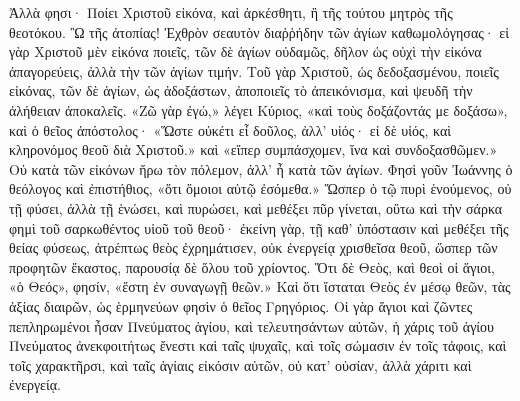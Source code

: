 \documentclass[10pt]{book}
\newcommand{\switchGreek}[1][]{\selectlanguage{polutonikogreek} \switchcolumn*[#1]}
\newcommand{\switchEnglish}{\selectlanguage{english} \switchcolumn}
\begin{document}
\begin{paracol}{2}
\switchGreek

Ἀλλὰ φησι· Ποίει Χριστοῦ εἰκόνα, καὶ ἀρκέσθητι, ἢ τῆς τούτου μητρὸς τῆς θεοτόκου.
Ὢ τῆς ἀτοπίας!
Ἐχθρὸν σεαυτὸν διαῥῥήδην τῶν ἁγίων καθωμολόγησας· εἰ γὰρ Χριστοῦ μὲν εἰκόνα ποιεῖς, τῶν δὲ ἁγίων οὐδαμῶς, δῆλον ὡς οὐχὶ τὴν εἰκόνα ἀπαγορεύεις, ἀλλὰ τὴν τῶν ἁγίων τιμήν.
Τοῦ γὰρ Χριστοῦ, ὡς δεδοξασμένου, ποιεῖς εἰκόνας, τῶν δὲ ἁγίων, ὡς ἀδοξάστων, ἀποποιεῖς τὸ ἀπεικόνισμα, καὶ ψευδῆ τὴν ἀλήθειαν ἀποκαλεῖς.
«Ζῶ γὰρ ἐγώ,» λέγει Κύριος, «καὶ τοὺς δοξάζοντάς με δοξάσω», καὶ ὁ θεῖος ἀπόστολος· «Ὥστε οὐκέτι εἶ δοῦλος, ἀλλ’ υἱός· εἰ δὲ υἱός, καὶ κληρονόμος θεοῦ διὰ Χριστοῦ.» καὶ «εἴπερ συμπάσχομεν, ἵνα καὶ συνδοξασθῶμεν.» Οὐ κατὰ τῶν εἰκόνων ἤρω τὸν πόλεμον, ἀλλ’ ἦ κατὰ τῶν ἁγίων.
Φησὶ γοῦν Ἰωάννης ὁ θεόλογος καὶ ἐπιστήθιος, «ὅτι ὅμοιοι αὐτῷ ἐσόμεθα.» Ὥσπερ ὁ τῷ πυρὶ ἑνούμενος, οὐ τῇ φύσει, ἀλλὰ τῇ ἑνώσει, καὶ πυρώσει, καὶ μεθέξει πῦρ γίνεται, οὕτω καὶ τὴν σάρκα φημὶ τοῦ σαρκωθέντος υἱοῦ τοῦ θεοῦ· ἐκείνη γὰρ, τῇ καθ’ ὑπόστασιν καὶ μεθέξει τῆς θείας φύσεως, ἀτρέπτως θεὸς ἐχρημάτισεν, οὐκ ἐνεργείᾳ χρισθεῖσα θεοῦ, ὥσπερ τῶν προφητῶν ἕκαστος, παρουσίᾳ δὲ ὅλου τοῦ χρίοντος.
Ὅτι δὲ Θεὸς, καὶ θεοὶ οἱ ἅγιοι, «ὁ Θεός», φησίν, «ἔστη ἐν συναγωγῇ θεῶν.»
Καὶ ὅτι ἵσταται Θεὸς ἐν μέσῳ θεῶν, τὰς ἀξίας διαιρῶν, ὡς ἑρμηνεύων φησὶν ὁ θεῖος Γρηγόριος.
Οἱ γὰρ ἅγιοι καὶ ζῶντες πεπληρωμένοι ἦσαν Πνεύματος ἁγίου, καὶ τελευτησάντων αὐτῶν, ἡ χάρις τοῦ ἁγίου Πνεύματος ἀνεκφοιτήτως ἔνεστι καὶ ταῖς ψυχαῖς, καὶ τοῖς σώμασιν ἐν τοῖς τάφοις, καὶ τοῖς χαρακτῆρσι, καὶ ταῖς ἁγίαις εἰκόσιν αὐτῶν, οὐ κατ’ οὐσίαν, ἀλλὰ χάριτι καὶ ἐνεργείᾳ.

\switchEnglish


\end{paracol}
\end{document}

